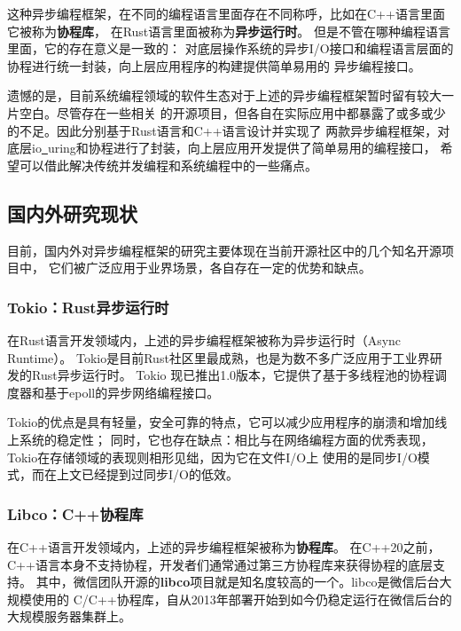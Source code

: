 \documentclass[supercite]{HustGraduPaper}
\theoremstyle{definition}
\begin{document}
这种异步编程框架，在不同的编程语言里面存在不同称呼，比如在C++语言里面它被称为\textbf{协程库}，
在Rust语言里面被称为\textbf{异步运行时}\cite{rosendahl2017green}。
但是不管在哪种编程语言里面，它的存在意义是一致的：
对底层操作系统的异步I/O接口和编程语言层面的协程进行统一封装，向上层应用程序的构建提供简单易用的
异步编程接口。\par

遗憾的是，目前系统编程领域的软件生态对于上述的异步编程框架暂时留有较大一片空白。尽管存在一些相关
的开源项目，但各自在实际应用中都暴露了或多或少的不足。因此分别基于Rust语言\cite{klabnik2019rust}和C++语言设计并实现了
两款异步编程框架，对底层io\underline{~}uring和协程进行了封装，向上层应用开发提供了简单易用的编程接口，
希望可以借此解决传统并发编程和系统编程中的一些痛点。\par

\subsection{国内外研究现状}

目前，国内外对异步编程框架的研究主要体现在当前开源社区中的几个知名开源项目中，
它们被广泛应用于业界场景，各自存在一定的优势和缺点。

\subsubsection{Tokio：Rust异步运行时}
在Rust语言开发领域内，上述的异步编程框架被称为异步运行时（Async Runtime）。
Tokio\cite{tokio.org}是目前Rust社区里最成熟，也是为数不多广泛应用于工业界研发的Rust异步运行时。
Tokio 现已推出1.0版本，它提供了基于多线程池的协程调度器和基于epoll\cite{gammo2004comparing}的异步网络编程接口。\par

Tokio的优点是具有轻量，安全可靠的特点，它可以减少应用程序的崩溃和增加线上系统的稳定性；
同时，它也存在缺点：相比与在网络编程方面的优秀表现，Tokio在存储领域的表现则相形见绌，因为它在文件I/O上
使用的是同步I/O模式，而在上文已经提到过同步I/O的低效。\par

\subsubsection{Libco：C++协程库}
在C++语言开发领域内，上述的异步编程框架被称为\textbf{协程库}。
在C++20之前，C++语言本身不支持协程，开发者们通常通过第三方协程库来获得协程的底层支持。
其中，微信团队开源的\textbf{libco}\cite{libco.org}项目就是知名度较高的一个。libco是微信后台大规模使用的
C/C++协程库，自从2013年部署开始到如今仍稳定运行在微信后台的大规模服务器集群上。\par
\end{document}

